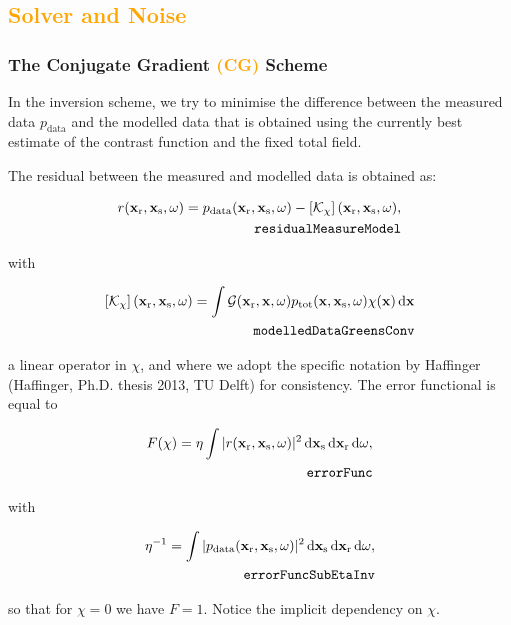 \documentclass[10pt,a4paper]{article}
\newcommand{\df}[1]{\, \ensuremath{\mbox{d}#1}}
\newcommand{\xs}{\mathbf{x}_\text{s}}
\newcommand{\xr}{\mathbf{x}_\text{r}}
\newcommand{\x}{\mathbf{x}}
\begin{document}
\subsection{\textcolor{orange}{Solver and Noise}}
\subsubsection{The Conjugate Gradient \textcolor{orange}{(CG)} Scheme}
\label{conjgrad}
In the inversion scheme, we try to minimise the difference between the
measured data $p_\text{data}$ and the modelled data that is obtained
using the currently best estimate of the contrast function and the
fixed total field.

The residual between the measured and modelled data is obtained as:

\begin{align} \label{eq:residualMeasureModel} r(\xr, \xs, \omega) =
p_{\text{data}}(\xr, \xs, \omega) - \left[\mathcal{K}_\chi
\right](\xr, \xs, \omega),\\
\tag*{\texttt{residualMeasureModel}}
\end{align}

with

\begin{align} \label{eq:modelledDataGreensConv} \left[\mathcal{K}_\chi \right](\xr,
\xs, \omega) = \int \mathcal{G}(\xr, \x, \omega) p_\text{tot}(\x, \xs,
\omega) \chi(\x) \df{\x}\\
\tag*{\texttt{modelledDataGreensConv}}
\end{align}

a linear operator in $\chi$, and where we adopt the specific notation
by Haffinger (Haffinger, Ph.D. thesis 2013, TU Delft) for consistency.
The error functional is equal to

\begin{align} \label{eq:errorFunc} F(\chi) = \eta \int |r(\xr, \xs,
\omega)|^2 \df{\mathbf{x}_\text{s}} \df{\xr}
\df{\omega},\\
\tag*{\texttt{errorFunc}}
\end{align}

with

\begin{align} \label{eq:errorFuncSubEtaInv} \eta^{-1} = \int | p_\text{data}(\xr,
\xs, \omega) |^2 \df{\xs} \df{\xr} \df{\omega}, \\
\tag*{\texttt{errorFuncSubEtaInv}} 
 \end{align}

so that for $\chi = 0$ we have $F = 1$. Notice the implicit dependency
on $\chi$.
\end{document}
